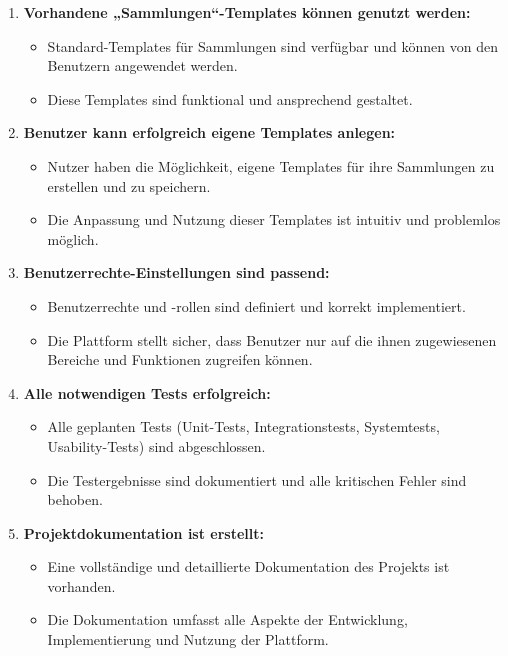 \begin{enumerate}
\item \textbf{Vorhandene „Sammlungen“-Templates können genutzt werden:}
\begin{itemize}[label=--, itemsep=0pt, parsep=0pt]
\item Standard-Templates für Sammlungen sind verfügbar und können von den Benutzern angewendet werden.
\item Diese Templates sind funktional und ansprechend gestaltet.
\end{itemize}

\item \textbf{Benutzer kann erfolgreich eigene Templates anlegen:}
\begin{itemize}[label=--, itemsep=0pt, parsep=0pt]
\item Nutzer haben die Möglichkeit, eigene Templates für ihre Sammlungen zu erstellen und zu speichern.
\item Die Anpassung und Nutzung dieser Templates ist intuitiv und problemlos möglich.
\end{itemize}

\item \textbf{Benutzerrechte-Einstellungen sind passend:}
\begin{itemize}[label=--, itemsep=0pt, parsep=0pt]
\item Benutzerrechte und -rollen sind definiert und korrekt implementiert.
\item Die Plattform stellt sicher, dass Benutzer nur auf die ihnen zugewiesenen Bereiche und Funktionen zugreifen können.
\end{itemize}

\item \textbf{Alle notwendigen Tests erfolgreich:}
\begin{itemize}[label=--, itemsep=0pt, parsep=0pt]
\item Alle geplanten Tests (Unit-Tests, Integrationstests, Systemtests, Usability-Tests) sind abgeschlossen.
\item Die Testergebnisse sind dokumentiert und alle kritischen Fehler sind behoben.
\end{itemize}

\item \textbf{Projektdokumentation ist erstellt:}
\begin{itemize}[label=--, itemsep=0pt, parsep=0pt]
\item Eine vollständige und detaillierte Dokumentation des Projekts ist vorhanden.
\item Die Dokumentation umfasst alle Aspekte der Entwicklung, Implementierung und Nutzung der Plattform.
\end{itemize}


\end{enumerate}
